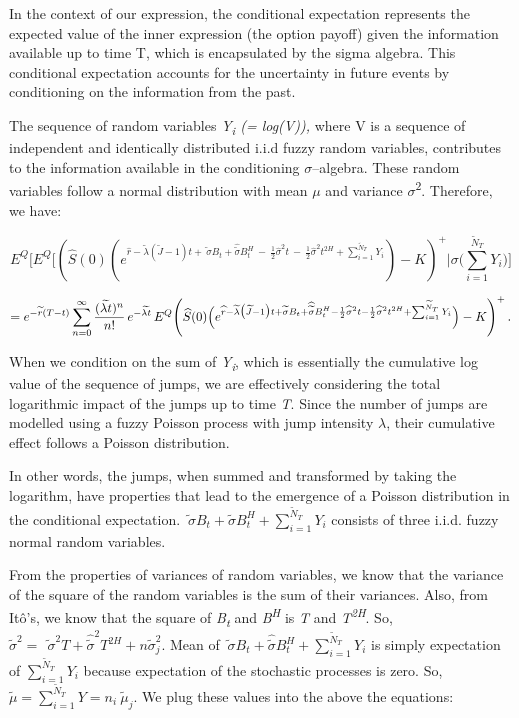 \documentclass[12pt,a4paper]{report}
\numberwithin{equation}{section}
\begin{document}
In the context of our expression, the conditional expectation represents
the expected value of the inner expression (the option payoff) given the
information available up to time T, which is encapsulated by the sigma
algebra. This conditional expectation accounts for the uncertainty in
future events by conditioning on the information from the past.

The sequence of random variables \emph{Y\textsubscript{i} (= log(V)),}
where V is a sequence of independent and identically distributed i.i.d
fuzzy random variables, contributes to the information available in the
conditioning $\sigma$--algebra. These random variables follow a normal
distribution with mean $\mu$ and variance $\sigma$\textsuperscript{2}. Therefore,
we have:

\[E^{Q}\lbrack E^{Q}\lbrack\left( \widehat{S}(0)(e^{\widehat{r} - \widetilde{\lambda}\left( \widetilde{J} - 1 \right)t + \widetilde{\ \sigma}B_{t} + \widehat{\widetilde{\sigma}}B_{t}^{H}\  - \ \frac{1}{2}{\widehat{\sigma}}^{2}t\  - \ \frac{1}{2}{\widehat{\sigma}}^{2}t^{2H} + \sum_{i = 1}^{{\widetilde{N}}_{T}}Y_{i}}) - K \right)^{+}|\sigma(\sum_{i = 1}^{{\widetilde{N}}_{T}}{Y_{i})}\rbrack\]

\[
= e^{-\widetilde{r}(T-t)}
\sum_{n=0}^{\infty}\frac{(\widetilde{\lambda t})^{n}}{n!}\,e^{-\widetilde{\lambda t}}\,
E^{Q}\!\left(\widehat{S}(0)\Bigl(e^{\widehat{r}-\widetilde{\lambda}\bigl(\widetilde{J}-1\bigr)t
+\widetilde{\sigma}B_{t}+\widehat{\widetilde{\sigma}}B_{t}^{H}
-\frac{1}{2}\widehat{\sigma}^{2}t-\frac{1}{2}\widehat{\sigma}^{2}t^{2H}
+\sum_{i=1}^{{\widetilde{N}}_{T}}Y_{i}}\Bigr)-K\right)^{+}.
\]


When we condition on the sum of \emph{Y\textsubscript{i}}, which is
essentially the cumulative log value of the sequence of jumps, we are
effectively considering the total logarithmic impact of the jumps up to
time \emph{T}. Since the number of jumps are modelled using a fuzzy
Poisson process with jump intensity \emph{$\lambda$}, their cumulative effect
follows a Poisson distribution.

In other words, the jumps, when summed and transformed by taking the
logarithm, have properties that lead to the emergence of a Poisson
distribution in the conditional expectation.
\(\widetilde{\ \sigma}B_{t} + \widehat{\widetilde{\sigma}}B_{t}^{H} + \sum_{i = 1}^{{\widetilde{N}}_{T}}Y_{i}\)
consists of three i.i.d. fuzzy normal random variables.

From the properties of variances of random variables, we know that the
variance of the square of the random variables is the sum of their
variances. Also, from Itô's, we know that the square of
\emph{B\textsubscript{t}} and \emph{B\textsuperscript{H}} is \emph{T}
and \emph{T\textsuperscript{2H}}. So,
\({\widetilde{\sigma}}^{2} = \ {\widetilde{\ \sigma}}^{2}T + {\widehat{\widetilde{\sigma}}}^{2}T^{2H} + n{\widetilde{\sigma}}_{j}^{2}\).
Mean of
\(\widetilde{\ \sigma}B_{t} + \widehat{\widetilde{\sigma}}B_{t}^{H} + \sum_{i = 1}^{{\widetilde{N}}_{T}}Y_{i}\)
is simply expectation of \(\sum_{i = 1}^{{\widetilde{N}}_{T}}Y_{i}\)
because expectation of the stochastic processes is zero. So,
\(\widetilde{\mu} = \sum_{i = 1}^{{\widetilde{N}}_{T}}{Y = n}_{i}\ {\widetilde{\mu}}_{j}\).
We plug these values into the above the equations:
\end{document}
